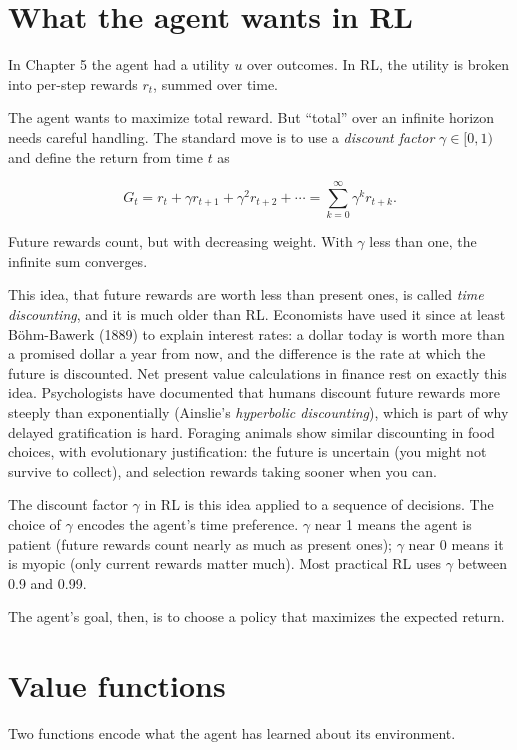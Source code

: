 \section*{What the agent wants in RL}

In Chapter 5 the agent had a utility $u$ over outcomes. In RL, the utility is broken into per-step rewards $r_t$, summed over time.

The agent wants to maximize total reward. But ``total'' over an infinite horizon needs careful handling. The standard move is to use a \emph{discount factor} $\gamma \in [0, 1)$ and define the return from time $t$ as

$$G_t = r_t + \gamma r_{t+1} + \gamma^2 r_{t+2} + \cdots = \sum_{k=0}^{\infty} \gamma^k r_{t+k}.$$

Future rewards count, but with decreasing weight. With $\gamma$ less than one, the infinite sum converges.

This idea, that future rewards are worth less than present ones, is called \emph{time discounting}, and it is much older than RL. Economists have used it since at least Böhm-Bawerk (1889) to explain interest rates: a dollar today is worth more than a promised dollar a year from now, and the difference is the rate at which the future is discounted. Net present value calculations in finance rest on exactly this idea. Psychologists have documented that humans discount future rewards more steeply than exponentially (Ainslie's \emph{hyperbolic discounting}), which is part of why delayed gratification is hard. Foraging animals show similar discounting in food choices, with evolutionary justification: the future is uncertain (you might not survive to collect), and selection rewards taking sooner when you can.

The discount factor $\gamma$ in RL is this idea applied to a sequence of decisions. The choice of $\gamma$ encodes the agent's time preference. $\gamma$ near 1 means the agent is patient (future rewards count nearly as much as present ones); $\gamma$ near 0 means it is myopic (only current rewards matter much). Most practical RL uses $\gamma$ between 0.9 and 0.99.

The agent's goal, then, is to choose a policy that maximizes the expected return.

\section*{Value functions}

Two functions encode what the agent has learned about its environment.

